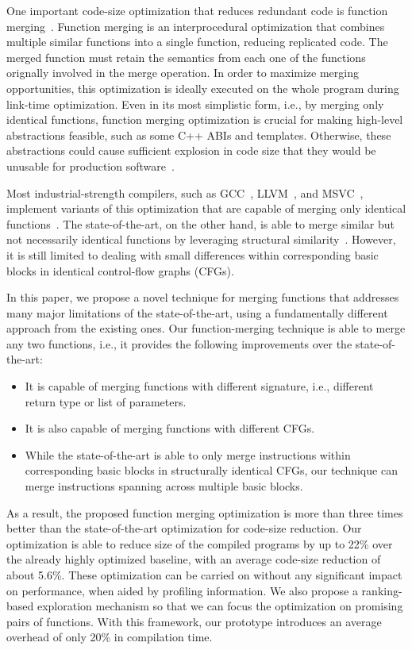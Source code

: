 One important code-size optimization that reduces redundant code is function
merging~\cite{tallam10,edler14}.
Function merging is an interprocedural optimization that combines multiple
similar functions into a single function, reducing replicated code.
The merged function must retain the semantics from each one of the functions
orignally involved in the merge operation.
In order to maximize merging opportunities, this optimization is ideally
executed on the whole program during link-time optimization.
Even in its most simplistic form, i.e., by merging only identical functions,
function merging optimization is crucial for making high-level abstractions
feasible, such as some C++ ABIs and templates.
Otherwise, these abstractions could cause sufficient explosion in code size that
they would be unusable for production software~\cite{tallam10,kwan12}.

Most industrial-strength compilers, such as GCC~\cite{gcc}, LLVM~\cite{llvm},
and MSVC~\cite{msvc-icf}, implement variants of this optimization that are
capable of merging only identical functions~\cite{tallam10,kwan12,livska14}.
The state-of-the-art, on the other hand, is able to merge similar but not
necessarily identical functions by leveraging structural similarity~\cite{edler14}.
However, it is still limited to dealing with small differences within
corresponding basic blocks in identical control-flow graphs (CFGs).

In this paper, we propose a novel technique for merging functions
that addresses many major limitations of the state-of-the-art, using a
fundamentally different approach from the existing ones.
Our function-merging technique is able to merge any two functions, i.e., it
provides the following improvements over the state-of-the-art:
\begin{itemize}[noitemsep,topsep=0pt]
  \item It is capable of merging functions with different signature, i.e.,
  different return type or list of parameters.
  \item It is also capable of merging functions with different CFGs.
  \item While the state-of-the-art is able to only merge instructions within
  corresponding basic blocks in structurally identical CFGs,
  our technique can merge instructions spanning across multiple basic blocks.
\end{itemize}
As a result, the proposed function merging optimization is
more than three times better than the state-of-the-art optimization for
code-size reduction.
Our optimization is able to reduce size of the compiled programs by up to
22\% over the already highly optimized baseline, with an average code-size
reduction of about 5.6\%.
These optimization can be carried on without any significant impact on
performance, when aided by profiling information.
We also propose a ranking-based exploration mechanism so that we can focus
the optimization on promising pairs of functions.
With this framework, our prototype introduces an average overhead of only 20\%
in compilation time.



